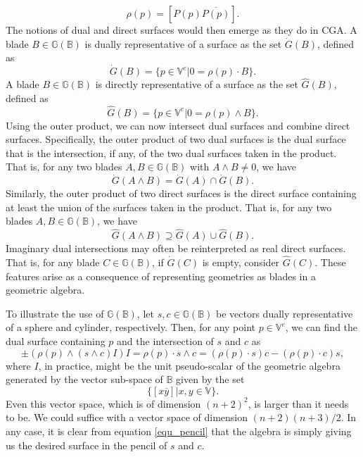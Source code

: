\documentclass{birkjour}
\theoremstyle{definition}
\theoremstyle{remark}
\numberwithin{equation}{section}
\newcommand{\G}{\mathbb{G}}
\newcommand{\V}{\mathbb{V}}
\newcommand{\B}{\mathbb{B}}
\newcommand{\Gi}{\dot{G}}
\newcommand{\Go}{\hat{G}}
\begin{document}
\begin{equation}
\rho(p) = [P(p)\overline{P(p)}].
\end{equation}
The notions of dual and direct surfaces
would then emerge as they do in CGA.  A blade $B\in\G(\B)$ is dually representative
of a surface as the set $\Gi(B)$, defined as
\begin{equation}
\Gi(B) = \{p\in\V^e|0=\rho(p)\cdot B\}.
\end{equation}
A blade $B\in\G(\B)$ is directly representative of a surface as the set $\Go(B)$,
defined as
\begin{equation}
\Go(B) = \{p\in\V^e|0=\rho(p)\wedge B\}.
\end{equation}
Using the outer product, we can now
intersect dual surfaces and combine direct surfaces.  Specifically, the outer product
of two dual surfaces is the dual surface that is the intersection, if any, of the two
dual surfaces taken in the product.  That is, for any two blades $A,B\in\G(\B)$
with $A\wedge B\neq 0$, we have
\begin{equation}
\Gi(A\wedge B)=\Gi(A)\cap\Gi(B).
\end{equation}
Similarly, the outer product
of two direct surfaces is the direct surface containing at least the union of the surfaces
taken in the product.  That is, for any two blades $A,B\in\G(\B)$, we have
\begin{equation}
\Go(A\wedge B)\supseteq\Go(A)\cup\Go(B).
\end{equation}
Imaginary dual intersections may often be reinterpreted as real direct surfaces.  That is,
for any blade $C\in\G(\B)$, if $\Gi(C)$ is empty, consider $\Go(C)$.
These features arise as a consequence of representing geometries
as blades in a geometric algebra.

To illustrate the use of $\G(\B)$, let $s,c\in\G(\B)$ be vectors dually representative
of a sphere and cylinder, respectively.  Then, for any point $p\in\V^e$, we can find
the dual surface containing $p$ and the intersection of $s$ and $c$ as
\begin{equation}\label{equ_pencil}
\pm (\rho(p)\wedge(s\wedge c)I)I = \rho(p)\cdot s\wedge c =
(\rho(p)\cdot s)c - (\rho(p)\cdot c)s,
\end{equation}
where $I$, in practice, might be the unit pseudo-scalar of the geometric algebra
generated by the vector sub-space of $\B$ given by the set
\begin{equation}
\{[x\overline{y}]|x,y\in\V\}.
\end{equation}
Even this vector space, which is of dimension $(n+2)^2$, is larger than it needs to be.
We could suffice with a vector space of dimension $(n+2)(n+3)/2$.
In any case, it is clear from equation \eqref{equ_pencil} that the algebra
is simply giving us the desired surface in the pencil of $s$ and $c$.
\end{document}
